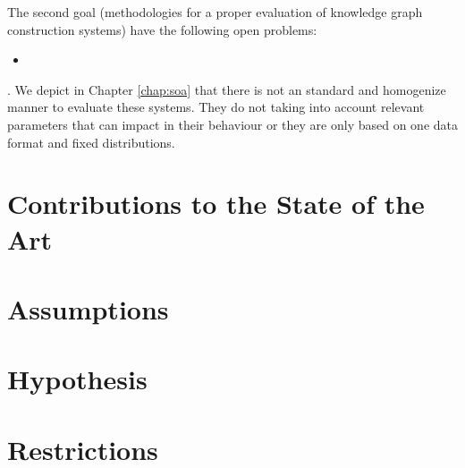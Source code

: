 The second goal (methodologies for a proper evaluation of knowledge graph construction systems) have the following open problems:
\begin{itemize}
    \item 
\end{itemize}
. We depict in Chapter \ref{chap:soa} that there is not an standard and homogenize manner to evaluate these systems. They do not taking into account relevant parameters that can impact in their behaviour or they are only based on one data format and fixed distributions.


\section{Contributions to the State of the Art}

\section{Assumptions}

\section{Hypothesis}

\section{Restrictions}
